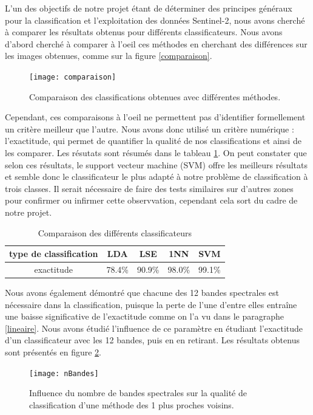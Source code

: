 \documentclass[a4paper,10pt]{report}
\begin{document}
L'un des objectifs de notre projet étant de déterminer des principes généraux pour la classification et l'exploitation des données Sentinel-2, nous avons cherché à comparer les résultats obtenus pour différents classificateurs. Nous avons d'abord cherché à comparer à l'oeil ces méthodes en cherchant des différences sur les images obtenues, comme sur la figure \ref{comparaison}.

\begin{figure}
  \centering
    \texttt{[image: comparaison]}
  \caption{Comparaison des classifications obtenues avec différentes méthodes.}
  \label{fig:comparaison}
\end{figure}
Cependant, ces comparaisons à l'oeil ne permettent pas d'identifier formellement un critère meilleur que l'autre. Nous avons donc utilisé un critère numérique : l'exactitude, qui permet de quantifier la qualité de nos classifications et ainsi de les comparer. Les résutats sont résumés dans le tableau \ref{table:comp}. On peut constater que selon ces résultats, le support vecteur machine (SVM) offre les meilleurs résultats et semble donc le classificateur le plus adapté à notre problème de classification à trois classes. Il serait nécessaire de faire des tests similaires sur d'autres zones pour confirmer ou infirmer cette observvation, cependant cela sort du cadre de notre projet.

\begin{table}
\begin{center}
 \begin{tabular}{|c|c|c|c|c|}
  \hline
  type de classification & LDA & LSE & 1NN & SVM \\
  \hline
exactitude & 78.4\% & 90.9\% & 	98.0\% & 99.1\% \\
  \hline
  \end{tabular}
\end{center}
\label{table:comp}
\caption{Comparaison des différents classificateurs}
\end{table}

Nous avons également démontré que chacune des 12 bandes spectrales est nécessaire dans la classification, puisque la perte de l'une d'entre elles entraîne une baisse significative de l'exactitude comme on l'a vu dans le paragraphe \ref{lineaire}. Nous avons étudié l'influence de ce paramètre en étudiant l'exactitude d'un classificateur avec les 12 bandes, puis en en retirant. Les résultats obtenus sont présentés en figure \ref{fig:nBandes}.

\begin{figure}
  \centering
    \texttt{[image: nBandes]}
  \caption{Influence du nombre de bandes spectrales sur la qualité de classification d'une méthode des 1 plus proches voisins.}
  \label{fig:nBandes}
\end{figure}
\end{document}
